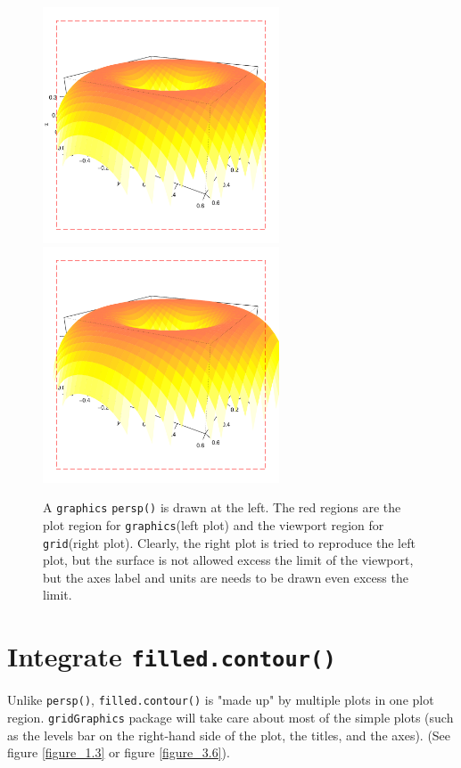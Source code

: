 \documentclass[paper=a4, fontsize=11pt]{report}
\begin{document}
\begin{figure}[h]
\begin{center}
  \includegraphics[height = 7cm, width = 7cm]{figure/gridGraphics_persp_demo_viewport3_1.pdf}
  \includegraphics[height = 7cm, width = 7cm]{figure/gridGraphics_persp_demo_viewport3_2.pdf}
  \caption{A \texttt{graphics} \texttt{persp()} is drawn at the left. The red regions are the plot region for \texttt{graphics}(left plot) and the viewport region for \texttt{grid}(right plot). Clearly, the right plot is tried to reproduce the left plot, but the surface is not allowed excess the limit of the viewport, but the axes label and units are needs to be drawn even excess the limit.}
  	\label{figure_4.5}
\end{center}
\end{figure}



\section{Integrate \texttt{filled.contour()}}
Unlike \texttt{persp()}, \texttt{filled.contour()} is "made up" by multiple plots in one plot region. \texttt{gridGraphics} package will take care about most of the simple plots (such as the levels bar on the right-hand side of the plot, the titles, and the axes). (See figure \ref{figure_1.3} or figure \ref{figure_3.6}).\\
\end{document}
